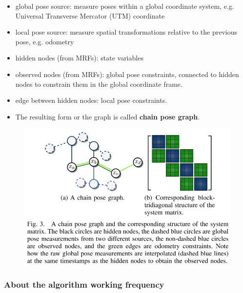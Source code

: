 \documentclass[letterpaper,11pt]{article}
\begin{document}
\begin{itemize}
	\item global pose source: measure poses within a global coordinate system, e.g. Universal Transverse Mercator (UTM) coordinate
	\item local pose source:  measure spatial transformations relative to the previous pose, e.g. odometry
	\item hidden nodes (from MRFs): state variables
	\item observed nodes (from MRFs): global pose constraints, connected to hidden nodes to constrain them in the global coordinate frame.
	\item edge between hidden nodes: local pose constraints.
	\item The resulting form or the graph is called \textbf{chain pose graph}.
\end{itemize}

\begin{figure}[!ht]
	\centering
	\includegraphics[width=15cm]{./img/posegraph.png}
\end{figure}

\subsubsection{About the algorithm working frequency}
\end{document}
